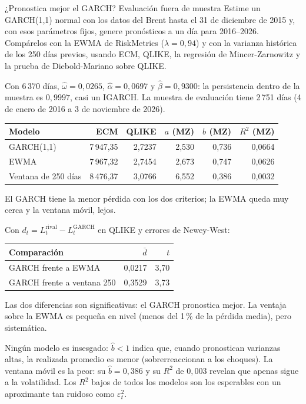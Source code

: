 \begin{ejresuelto}{¿Pronostica mejor el GARCH? Evaluación fuera de muestra}\label{ej:garchfuera}
\enunciado Estime un GARCH(1,1) normal con los datos del Brent hasta el 31 de diciembre de 2015 y, con esos
parámetros fijos, genere pronósticos a un día para 2016--2026. Compárelos con la EWMA de RiskMetrics
($\lambda=0{,}94$) y con la varianza histórica de los 250 días previos, usando ECM, QLIKE, la regresión de
Mincer-Zarnowitz y la prueba de Diebold-Mariano sobre QLIKE.

\solucion
{} Con 6\,370 días, $\hat\omega=0{,}0265$, $\hat\alpha=0{,}0697$ y $\hat\beta=0{,}9300$:
la persistencia dentro de la muestra es $0{,}9997$, casi un IGARCH. La muestra de evaluación tiene 2\,751 días
(4 de enero de 2016 a 3 de noviembre de 2026).

\begin{center}\small
\begin{tabular}{@{}lrrrrr@{}}
\toprule
Modelo & ECM & QLIKE & $a$ (MZ) & $b$ (MZ) & $R^2$ (MZ) \\
\midrule
GARCH(1,1)          & 7\,947,35 & 2,7237 & 2,530 & 0,736 & 0,0664 \\
EWMA                & 7\,967,32 & 2,7454 & 2,673 & 0,747 & 0,0626 \\
Ventana de 250 días & 8\,476,37 & 3,0766 & 6,552 & 0,386 & 0,0032 \\
\bottomrule
\end{tabular}
\end{center}
El GARCH tiene la menor pérdida con los dos criterios; la EWMA queda muy cerca y la ventana móvil, lejos.

 Con $d_t=L_t^{\text{rival}}-L_t^{\text{GARCH}}$ en QLIKE y errores de
Newey-West:
\begin{center}\small
\begin{tabular}{@{}lrr@{}}
\toprule
Comparación & $\bar d$ & $t$ \\
\midrule
GARCH frente a EWMA        & 0,0217 & 3,70 \\
GARCH frente a ventana 250 & 0,3529 & 3,73 \\
\bottomrule
\end{tabular}
\end{center}
Las dos diferencias son significativas: el GARCH pronostica mejor. La ventaja sobre la EWMA es pequeña en nivel
(menos del 1\,\% de la pérdida media), pero sistemática.

 Ningún modelo es insesgado: $\hat b<1$ indica que, cuando pronostican varianzas
altas, la realizada promedio es menor (sobrerreaccionan a los choques). La ventana móvil es la peor: su
$\hat b=0{,}386$ y su $R^2$ de $0{,}003$ revelan que apenas sigue a la volatilidad. Los $R^2$ bajos de todos los
modelos son los esperables con un aproximante tan ruidoso como $\varepsilon_t^2$.


\end{ejresuelto}
